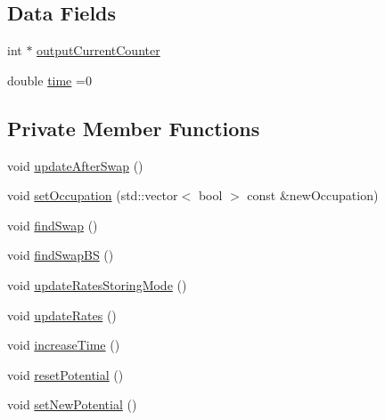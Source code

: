 \subsection*{Data Fields}
\begin{DoxyCompactItemize}
\item 
int $\ast$ \hyperlink{classSystem_a236f2d392daa817d39a5b23a8e6a57d5}{output\+Current\+Counter}
\item 
double \hyperlink{classSystem_aa9e002a5f2f169e37c545b76ee67e724}{time} =0
\end{DoxyCompactItemize}
\subsection*{Private Member Functions}
\begin{DoxyCompactItemize}
\item 
void \hyperlink{classSystem_ad32d6fd369f822d075e19698f8e6a2ae}{update\+After\+Swap} ()
\item 
void \hyperlink{classSystem_ac449110fcd692cdec9987730635179df}{set\+Occupation} (std\+::vector$<$ bool $>$ const \&new\+Occupation)
\item 
void \hyperlink{classSystem_a2570343111c1794aca7e6005b4726b92}{find\+Swap} ()
\item 
void \hyperlink{classSystem_afbafce4188cca27e7e37892049b45856}{find\+Swap\+BS} ()
\item 
void \hyperlink{classSystem_a2b1664dce6144f6a8104ebb678fb5c8b}{update\+Rates\+Storing\+Mode} ()
\item 
void \hyperlink{classSystem_a1f50240f4eecb60f8302307e6df814af}{update\+Rates} ()
\item 
void \hyperlink{classSystem_a6167b888fa30f9d8fa56a246c5f461b9}{increase\+Time} ()
\item 
void \hyperlink{classSystem_a94a96fbd71935aac883f3d9e026661ac}{reset\+Potential} ()
\item 
void \hyperlink{classSystem_ad41034bcdfc24395e67fe7e3d5f50330}{set\+New\+Potential} ()
\end{DoxyCompactItemize}
